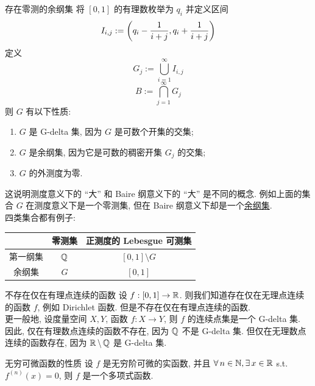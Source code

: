         \begin{ins}
            {存在零测的余纲集}
            将 \([0,1]\) 的有理数枚举为 \(q_i\) 并定义区间
            \[I_{i,j}:=\qty(q_i-\frac{1}{i+j},q_i+\frac{1}{i+j})\]
            定义
            \[G_j:=\bigcup_{i=1}^{\infty}I_{i,j}\]
            \[B:=\bigcap_{j=1}^{\infty}G_j\]
            则 \(G\) 有以下性质:
            \begin{enumerate}[label=(\arabic*)]
                \item \(G\) 是 G-delta 集, 因为 \(G\) 是可数个开集的交集;
                \item \(G\) 是余纲集, 因为它是可数的稠密开集 \(G_j\) 的交集;
                \item \(G\) 的外测度为零.
            \end{enumerate}
        \end{ins}

        \begin{rmk}
            [Dedicatia]
            这说明测度意义下的 ``大'' 和 Baire 纲意义下的 ``大'' 是不同的概念. 例如上面的集合 \(G\) 在测度意义下是一个零测集, 但在 Baire 纲意义下却是一个\hyperref[dfn:residual]{余纲集}.\\
            四类集合都有例子:
            \begin{center}
                \begin{tabular}{c|cc}
                    & 零测集 & 正测度的 Lebesgue 可测集 \\
                    \hline
                    第一纲集 & \(\operatorname{\mathbb{Q}}\) & \([0,1]\setminus G\) \\
                    余纲集 & \(G\) & \([0,1]\)
                \end{tabular}
            \end{center}
        \end{rmk}

        \begin{ins}
            {不存在仅在有理点连续的函数}
            设 \(f:[0,1]\to\operatorname{\mathbb{R}}\). 则我们知道存在仅在无理点连续的函数 \(f\), 例如 Dirichlet 函数. 但是不存在仅在有理点连续的函数. \\
            更一般地, 设度量空间 $X,Y$, 函数 $f:X \to Y$, 则 $f$ 的连续点集是一个 G-delta 集. \\
            因此, 仅在有理数点连续的函数不存在, 因为 $\operatorname{\mathbb{Q}}$ 不是 G-delta 集. 但仅在无理数点连续的函数存在, 因为 $\operatorname{\mathbb{R}} \setminus \operatorname{\mathbb{Q}}$ 是 G-delta 集.
        \end{ins}

        \begin{ins}
            {无穷可微函数的性质}
            设 \(f\) 是无穷阶可微的实函数, 并且 \(\forall\,n\in\operatorname{\mathbb{N}}, \exists\,x\in\operatorname{\mathbb{R}}\) s.t. \(f^{(n)}(x)=0\), 则 \(f\) 是一个多项式函数.
        \end{ins}

